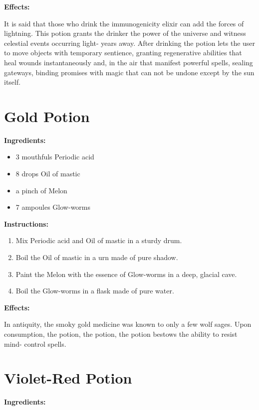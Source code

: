 \documentclass{article}
\begin{document}
\textbf{Effects:}

It is said that those who drink the immunogenicity elixir can add the forces of lightning. This potion grants the drinker the power of the universe and witness celestial events occurring light- years away. After drinking the potion lets the user to move objects with temporary sentience, granting regenerative abilities that heal wounds instantaneously and, in the air that manifest powerful spells, sealing gateways, binding promises with magic that can not be undone except by the sun itself.

\newpage
\section*{Gold Potion}

\textbf{Ingredients:}

\begin{itemize}
  \item 3 mouthfuls Periodic acid
  \item 8 drops Oil of mastic
  \item a pinch of Melon
  \item 7 ampoules Glow-worms
\end{itemize}

\textbf{Instructions:}

\begin{enumerate}
  \item Mix Periodic acid and Oil of mastic in a sturdy drum.
  \item Boil the Oil of mastic in a urn made of pure shadow.
  \item Paint the Melon with the essence of Glow-worms in a deep, glacial cave.
  \item Boil the Glow-worms in a flask made of pure water.
\end{enumerate}

\textbf{Effects:}

In antiquity, the smoky gold medicine was known to only a few wolf sages. Upon consumption, the potion, the potion, the potion bestows the ability to resist mind- control spells.

\newpage
\section*{Violet-Red Potion}

\textbf{Ingredients:}
\end{document}
